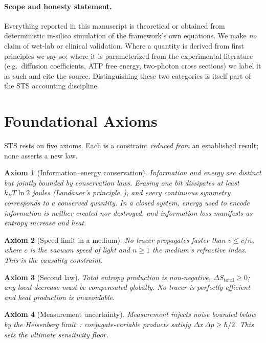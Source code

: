 \documentclass[11pt,a4paper]{article}
\newtheorem{axiom}{Axiom}[section]
\begin{document}
\paragraph{Scope and honesty statement.}
Everything reported in this manuscript is theoretical or obtained from
deterministic in-silico simulation of the framework's own equations. We make
\emph{no} claim of wet-lab or clinical validation. Where a quantity is derived
from first principles we say so; where it is parameterized from the experimental
literature (e.g.\ diffusion coefficients, ATP free energy, two-photon cross
sections) we label it as such and cite the source. Distinguishing these two
categories is itself part of the STS accounting discipline.

\section{Foundational Axioms}
\label{sec:axioms}

STS rests on five axioms. Each is a constraint \emph{reduced from} an established
result; none asserts a new law.

\begin{axiom}[Information--energy conservation]\label{ax:a1}
Information and energy are distinct but jointly bounded by conservation laws.
Erasing one bit dissipates at least $k_B T \ln 2$ joules (Landauer's
principle~\citep{landauer1961irreversibility,bennett1982thermodynamics}), and
every continuous symmetry corresponds to a conserved quantity. In a closed
system, energy used to encode information is neither created nor destroyed, and
information loss manifests as entropy increase and heat.
\end{axiom}

\begin{axiom}[Speed limit in a medium]\label{ax:a2}
No tracer propagates faster than $v \le c/n$, where $c$ is the vacuum speed of
light and $n\ge 1$ the medium's refractive index. This is the causality
constraint.
\end{axiom}

\begin{axiom}[Second law]\label{ax:a3}
Total entropy production is non-negative, $\Delta S_\mathrm{total}\ge 0$; any local
decrease must be compensated globally. No tracer is perfectly efficient and heat
production is unavoidable.
\end{axiom}

\begin{axiom}[Measurement uncertainty]\label{ax:a4}
Measurement injects noise bounded below by the Heisenberg
limit~\citep{heisenberg1927uncertainty}: conjugate-variable products satisfy
$\Delta x\,\Delta p \ge \hbar/2$. This sets the ultimate sensitivity floor.
\end{axiom}
\end{document}
